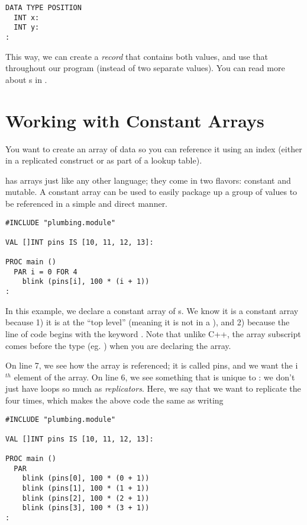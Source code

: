 \begin{lstlisting}
DATA TYPE POSITION
  INT x:
  INT y:
:
\end{lstlisting}

This way, we can create a \emph{record} that contains both values, and use that throughout our program (instead of two separate values). You can read more about {\RECORD}s in \FIXME.

\seealso

\XXX

% 

\section{Working with Constant Arrays}
\problem
You want to create an array of data so you can reference it using an index (either in a replicated construct or as part of a lookup table). 

\solution
\occam has arrays just like any other language; they come in two flavors: constant and mutable. A constant array can be used to easily package up a group of values to be referenced in a simple and direct manner.

\begin{lstlisting}
#INCLUDE "plumbing.module"

VAL []INT pins IS [10, 11, 12, 13]:

PROC main ()
  PAR i = 0 FOR 4
    blink (pins[i], 100 * (i + 1))
:
\end{lstlisting}

In this example, we declare a constant array of {\INT}s. We know it is a constant array because 1) it is at the ``top level'' (meaning it is not in a \PROC), and 2) because the line of code begins with the keyword \VAL. Note that unlike C++, the array subscript comes before the type (eg. {\code []\INT}) when you are declaring the array.

On line 7, we see how the array is referenced; it is called {\code pins}, and we want the {\code i}$^{th}$ element of the array. On line 6, we see something that is unique to \occam: we don't just have loops so much as \emph{replicators}. Here, we say that we want to replicate the \PAR four times, which makes the above code the same as writing

\begin{lstlisting}
#INCLUDE "plumbing.module"

VAL []INT pins IS [10, 11, 12, 13]:

PROC main ()
  PAR
    blink (pins[0], 100 * (0 + 1))
    blink (pins[1], 100 * (1 + 1))
    blink (pins[2], 100 * (2 + 1))
    blink (pins[3], 100 * (3 + 1))
:
\end{lstlisting}

